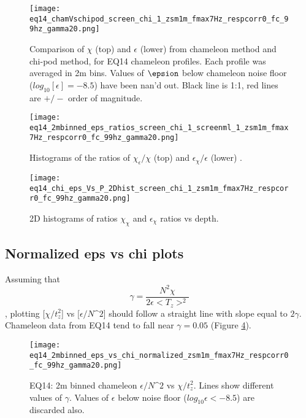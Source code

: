 \documentclass[11pt]{article}
\begin{document}
\begin{figure}[htbp]
\texttt{[image: eq14\_chamVschipod\_screen\_chi\_1\_zsm1m\_fmax7Hz\_respcorr0\_fc\_99hz\_gamma20.png]}
\caption{Comparison of $\chi$ (top) and $\epsilon$ (lower) from chameleon method and chi-pod method, for EQ14 chameleon profiles. Each profile was averaged in 2m bins.  Values of $\epsion$ below chameleon noise floor ($log_{10}[\epsilon]=-8.5$) have been nan'd out. Black line is 1:1, red lines are $+/-$ order of magnitude. }
\label{2DchamVschi}
\end{figure}


\begin{figure}[htbp]
\texttt{[image: eq14\_2mbinned\_eps\_ratios\_screen\_chi\_1\_screenml\_1\_zsm1m\_fmax7Hz\_respcorr0\_fc\_99hz\_gamma20.png]}
\caption{Histograms of the ratios of $\chi_{\epsilon}/\chi$ (top) and $\epsilon_{\chi}/\epsilon$ (lower) .}
\label{histchamVschi}
\end{figure}



\begin{figure}[htbp]
\texttt{[image: eq14\_chi\_eps\_Vs\_P\_2Dhist\_screen\_chi\_1\_zsm1m\_fmax7Hz\_respcorr0\_fc\_99hz\_gamma20.png]}
\caption{ 2D histograms of ratios $\chi_{\chi}$ and $\epsilon_{\chi}$ ratios vs depth.}
\label{chamVschivsP}
\end{figure}





\clearpage
\subsection{Normalized eps vs chi plots}

Assuming that
\begin{equation}
\gamma=\frac{N^2 \chi}{2\epsilon<T_z>^2}
\end{equation}
, plotting [$\chi/t_{z}^{2}$] vs [$\epsilon/N\^2$] should follow a straight line with slope equal to $2\gamma$. Chameleon data from EQ14 tend to fall near $\gamma=0.05$ (Figure \ref{chiepsnorm}).


\begin{figure}[htbp]
\texttt{[image: eq14\_2mbinned\_eps\_vs\_chi\_normalized\_zsm1m\_fmax7Hz\_respcorr0\_fc\_99hz\_gamma20.png]}
\caption{EQ14: 2m binned  chameleon $\epsilon/N\^2$ vs $\chi/t_{z}^{2}$. Lines show different values of $\gamma$. Values of $\epsilon$ below noise floor ($log_{10}\epsilon<-8.5$) are discarded also.}
\label{chiepsnorm}
\end{figure}
\end{document}
